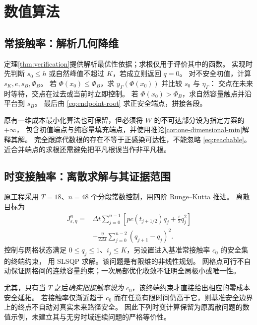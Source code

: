 \documentclass[11pt,a4paper,UTF8]{ctexart}
\theoremstyle{definition}
\begin{document}
\section{数值算法}
\label{sec:numerical-method}
\subsection{常接触率：解析几何降维}
定理\ref{thm:verification}提供解析最优性依据；求根仅用于评价其中的函数。
实现时先判断 $s_0\le h$ 或自然峰值不超过 $K$，若成立则返回 $q=0$。
对不安全初值，计算 $s_K,e,s_B,\Phi_B$。
若 $\Phi(x_0)\le\Phi_B$，求 $y_\Gamma(\Phi(x_0))$ 并比较 $s_0$ 与 $\eta_\Gamma$：
交点在未来时等待，交点在过去或当前时立即控制。
若 $\Phi(x_0)>\Phi_B$，求自然容量触点并沿平台到 $s_B$。
最后由 \eqref{eq:endpoint-root} 求正安全端点，拼接各段。

原有一维成本最小化算法也可保留，但必须将 $W$ 的不可达部分设为指定方案的 $+\infty$，
包含初值端点与纯容量填充端点，并使用推论\ref{cor:one-dimensional-min}解释其解。
完全跟踪代数根的存在不等于正感染可达性，不能忽略 \eqref{eq:reachable}。
近合并端点的求根还需避免把平凡根误当作非平凡根。

\subsection{时变接触率：离散求解与其证据范围}
原工程采用 $T=18$、$n=48$ 个分段常数控制，用四阶 Runge--Kutta 推进。
离散目标为
\begin{equation}
\begin{aligned}
J_{\varepsilon,\eta}^n={}&\Delta t\sum_{j=0}^{n-1}
\left[pc(t_{j+1/2})q_j+\frac\varepsilon2q_j^2\right]\\
&+\frac{\eta}{2\Delta t}\sum_{j=0}^{n-2}(q_{j+1}-q_j)^2.
\end{aligned}
\label{eq:discrete-objective}
\end{equation}
控制与网格状态满足 $0\le q_j\le1$、$i_j\le K$，另设置进入基准常接触率 $c_0$ 的安全集的终端约束，
用 SLSQP 求解。该问题是有限维的非线性规划。
网格点可行不自动保证网格间的连续容量约束；一次局部优化收敛不证明全局极小或唯一性。

尤其，只有当 $T$ 之后\emph{确实把接触率设为} $c_0$，该终端约束才直接给出相应的零成本安全延拓。
若接触率仅渐近趋于 $c_0$ 而在任意有限时间仍高于它，则基准安全边界上的终点不自动对真实未来路径安全。
因此下列时变计算保留为原离散问题的数值示例，未建立其与无穷时域连续问题的严格等价性。
\end{document}
